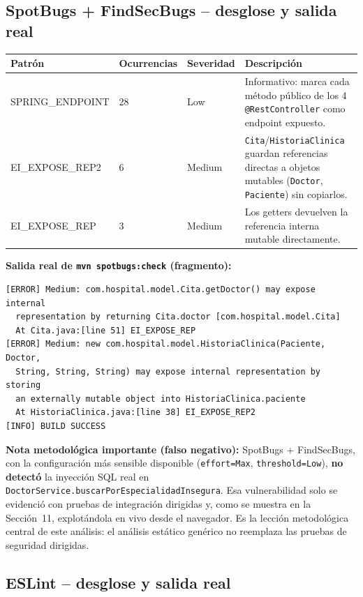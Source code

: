 \documentclass[11pt,a4paper]{article}
\begin{document}
\subsection{SpotBugs + FindSecBugs -- desglose y salida real}

\begin{longtable}{@{}p{3.5cm}p{1.7cm}p{1.5cm}p{6.5cm}@{}}
\toprule
\textbf{Patr\'on} & \textbf{Ocurrencias} & \textbf{Severidad} & \textbf{Descripci\'on} \\
\midrule
\endhead
SPRING\_ENDPOINT & 28 & Low & Informativo: marca cada m\'etodo p\'ublico de
  los 4 \texttt{@RestController} como endpoint expuesto. \\
EI\_EXPOSE\_REP2 & 6 & Medium & \texttt{Cita}/\texttt{HistoriaClinica}
  guardan referencias directas a objetos mutables (\texttt{Doctor},
  \texttt{Paciente}) sin copiarlos. \\
EI\_EXPOSE\_REP & 3 & Medium & Los getters devuelven la referencia interna
  mutable directamente. \\
\bottomrule
\end{longtable}

\textbf{Salida real de \texttt{mvn spotbugs:check} (fragmento):}
\begin{lstlisting}
[ERROR] Medium: com.hospital.model.Cita.getDoctor() may expose internal
  representation by returning Cita.doctor [com.hospital.model.Cita]
  At Cita.java:[line 51] EI_EXPOSE_REP
[ERROR] Medium: new com.hospital.model.HistoriaClinica(Paciente, Doctor,
  String, String, String) may expose internal representation by storing
  an externally mutable object into HistoriaClinica.paciente
  At HistoriaClinica.java:[line 38] EI_EXPOSE_REP2
[INFO] BUILD SUCCESS
\end{lstlisting}

\textbf{Nota metodol\'ogica importante (falso negativo):} SpotBugs +
FindSecBugs, con la configuraci\'on m\'as sensible disponible
(\texttt{effort=Max}, \texttt{threshold=Low}), \textbf{no detect\'o} la
inyecci\'on SQL real en \texttt{DoctorService.buscarPorEspecialidadInsegura}.
Esa vulnerabilidad solo se evidenci\'o con pruebas de integraci\'on
dirigidas y, como se muestra en la Secci\'on~11, explot\'andola en vivo desde
el navegador. Es la lecci\'on metodol\'ogica central de este an\'alisis: el
an\'alisis est\'atico gen\'erico no reemplaza las pruebas de seguridad
dirigidas.

\subsection{ESLint -- desglose y salida real}
\end{document}
